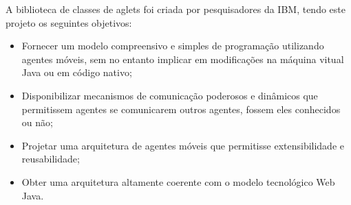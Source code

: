 A biblioteca de classes de aglets foi criada por pesquisadores da IBM, tendo este projeto os seguintes objetivos: 
\begin{itemize}
	\item Fornecer um modelo compreensivo e simples de programação utilizando agentes móveis, sem no entanto implicar em modificações na máquina vitual Java ou em código nativo;
	\item Disponibilizar mecanismos de comunicação poderosos e dinâmicos que permitissem agentes se comunicarem outros agentes, fossem eles conhecidos ou não;
	\item Projetar uma arquitetura de agentes móveis que permitisse extensibilidade e reusabilidade;
	\item Obter uma arquitetura altamente coerente com o modelo tecnológico Web\/ Java.  
\end{itemize}

